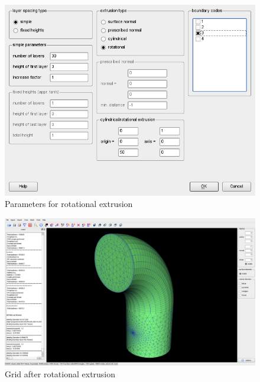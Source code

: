 \begin{figure}
  \begin{centering}
    \includegraphics[width=132mm]{figures/tutorials/T1/scr06}
    \par
  \end{centering}
  \caption{Parameters for rotational extrusion}
  \label{fig:T1_scr06}
\end{figure}
\begin{figure}
  \begin{centering}
    \includegraphics[width=14cm]{figures/tutorials/T1/scr07}
    \par
  \end{centering}
  \caption{Grid after rotational extrusion}
  \label{fig:T1_scr07}
\end{figure}
